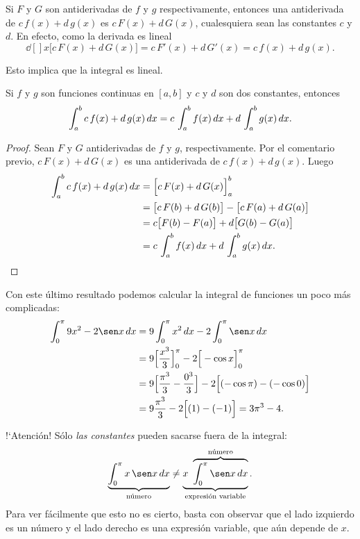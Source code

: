 \begin{remark}
  Si $F$ y $G$ son antiderivadas de $f$ y $g$ respectivamente, entonces una antiderivada de $c\, f(x)+d\, g(x)$ es 
  $c\, F(x) + d\, G(x)$, cualesquiera sean las constantes $c$ y $d$.
  En efecto, como la derivada es lineal
  $$ 
  \dd[]{}{x}\big[c\, F(x) + d\, G(x) \big] = c\, F'(x)+d\,G'(x) = c\, f(x)+d\, g(x).
  $$
\end{remark}

Esto implica que la integral es lineal.

\begin{corollary}
Si $f$ y $g$ son funciones continuas en $[a,b]$ y $c$ y $d$ son dos constantes, entonces
$$ 
\int_a^b   c\, f(x)+d\, g(x) \,dx 
=
c\, \int_a^b  f(x) \,dx 
+
d\, \int_a^b   g(x) \,dx .
$$
\end{corollary}

\begin{proof}
  Sean $F$ y $G$ antiderivadas de $f$ y $g$, respectivamente.
  Por el comentario previo, $c\, F(x) + d\, G(x)$ es una antiderivada de $c\, f(x)+d\, g(x)$.
  Luego
  \begin{align*}
    \int_a^b   c\, f(x)+d\, g(x) \,dx  &= \Big[c\, F(x) + d\, G(x)\Big]_a^b
    \\
    &= \big[c\, F(b) + d\, G(b)\big] - \big[c\, F(a) + d\, G(a)\big]
    \\
    &= c \big[F(b)-F(a)\big] + d \big[G(b)-G(a)\big] 
    \\
    &= c\, \int_a^b  f(x) \,dx 
    +
    d\, \int_a^b   g(x) \,dx .
    \qedhere
  \end{align*}
\end{proof}

\begin{example}
  Con este último resultado podemos calcular la integral de funciones un poco más complicadas:
  \begin{align*}
    \int_0^\pi 9x^2 - 2 \sen x\dx
    &= 9 \int_0^\pi x^2 \dx - 2 \int_0^\pi \sen x\dx
    \\
    &= 9 \Big[ \frac{x^3}3\Big]_0^\pi  - 2 \Big[-\cos x\Big]_0^\pi
    \\
    &= 9 \Big[ \frac{\pi^3}3-\frac{0^3}3\Big]  - 2 \Big[(-\cos \pi)-(-\cos 0)\Big]
    \\
    &= 9 \frac{\pi^3}3 - 2 \Big[(1)-(-1)\Big]
    = 3 \pi^3 - 4.
  \end{align*}
\end{example}

\begin{remark}
  !`Atención! Sólo \emph{las constantes} pueden sacarse fuera de la integral:
  \[
  \underbrace{\int_0^\pi x\, \sen x\dx}_{\text{número}} \neq \underbrace{x \  \overbrace{\int_0^\pi \sen x\dx}^{\text{número}}}_{\text{expresión variable}}.
  \]
  Para ver fácilmente que esto no es cierto, basta con observar que el lado izquierdo es un número y el lado derecho es una expresión variable, que aún depende de $x$.
\end{remark}


